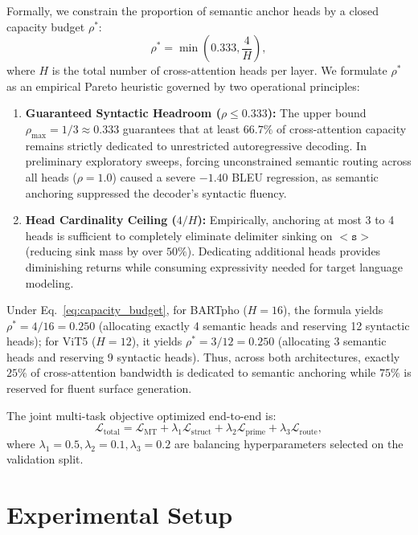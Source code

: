\documentclass[11pt]{article}
\begin{document}
Formally, we constrain the proportion of semantic anchor heads by a closed capacity budget $\rho^*$:
\begin{equation}
    \rho^* = \min\left(0.333, \frac{4}{H}\right),
    \label{eq:capacity_budget}
\end{equation}
where $H$ is the total number of cross-attention heads per layer. We formulate $\rho^*$ as an empirical Pareto heuristic governed by two operational principles:
\begin{enumerate}[leftmargin=*]
    \item \textbf{Guaranteed Syntactic Headroom ($\rho \le 0.333$):} The upper bound $\rho_{\max} = 1/3 \approx 0.333$ guarantees that at least $66.7\%$ of cross-attention capacity remains strictly dedicated to unrestricted autoregressive decoding. In preliminary exploratory sweeps, forcing unconstrained semantic routing across all heads ($\rho = 1.0$) caused a severe $-1.40$ BLEU regression, as semantic anchoring suppressed the decoder's syntactic fluency.
    \item \textbf{Head Cardinality Ceiling ($4/H$):} Empirically, anchoring at most 3 to 4 heads is sufficient to completely eliminate delimiter sinking on $\mathtt{<s>}$ (reducing sink mass by over $50\%$). Dedicating additional heads provides diminishing returns while consuming expressivity needed for target language modeling.
\end{enumerate}
Under Eq.~\eqref{eq:capacity_budget}, for BARTpho ($H=16$), the formula yields $\rho^* = 4/16 = 0.250$ (allocating exactly 4 semantic heads and reserving 12 syntactic heads); for ViT5 ($H=12$), it yields $\rho^* = 3/12 = 0.250$ (allocating 3 semantic heads and reserving 9 syntactic heads). Thus, across both architectures, exactly $25\%$ of cross-attention bandwidth is dedicated to semantic anchoring while $75\%$ is reserved for fluent surface generation.

The joint multi-task objective optimized end-to-end is:
\begin{equation}
    \mathcal{L}_{\text{total}} = \mathcal{L}_{\text{MT}} + \lambda_1 \mathcal{L}_{\text{struct}} + \lambda_2 \mathcal{L}_{\text{prime}} + \lambda_3 \mathcal{L}_{\text{route}},
    \label{eq:loss_total}
\end{equation}
where $\lambda_1 = 0.5, \lambda_2 = 0.1, \lambda_3 = 0.2$ are balancing hyperparameters selected on the validation split.

\section{Experimental Setup}
\label{sec:experiments}
\end{document}
